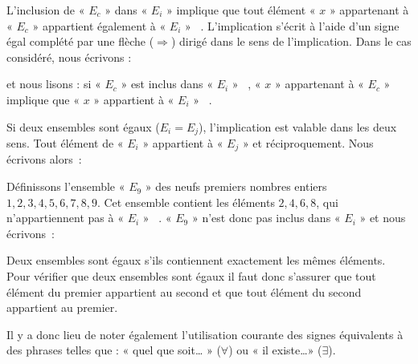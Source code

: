 \medskip


L'inclusion de « $E_{c}$ » dans « $E_{i}$ » implique que
tout élément «  $x$  » appartenant à « $E_{c}$ »  ap\-par\-tient
également à « $E_{i}$ » ~. L'implication s'écrit à l'aide d'un
signe égal complété par une flèche ($\Longrightarrow$) dirigé dans
le sens de l'implication. Dans le cas considéré, nous écrivons :
\medskip
\begin{center}
\end{center}
\medskip
et nous lisons : si « $E_{c}$ » est inclus dans « $E_{i}$ » ~,
« $x$ » appartenant à « $E_{c}$ » implique que «  $x$
 » appartient à « $E_{i}$ » ~.

Si deux ensembles sont égaux ($E_{i}=E_{j}$), l'implication est valable
dans les deux sens. Tout élément de « $E_{i}$ » appartient à
« $E_{j}$ » et réciproquement. Nous écrivons alors~:
\medskip
\begin{center}
\end{center}
\medskip
Définissons l'ensemble « $E_{9}$ » des neufs premiers nombres
entiers $1,2,3,4,5,6,7,8,9$. Cet ensemble contient les éléments $2,4,6,8$,
qui n'appartiennent pas à « $E_{i}$ » ~. « $E_{9}$ » n'est
donc pas inclus dans « $E_{i}$ » et nous écrivons~:
\medskip
\begin{center}
\end{center}
\medskip
Deux ensembles sont égaux s'ils contiennent exactement les mêmes éléments.
Pour vérifier que deux ensembles sont égaux il faut donc s'assurer
que tout élément du premier appartient au second et que tout élément
du second appartient au premier.

Il y a donc lieu de noter également l'utilisation courante des signes
équivalents à des phrases telles que : « quel que soit\ldots{} » ($\forall$)
ou « il existe\ldots » ($\exists$).

